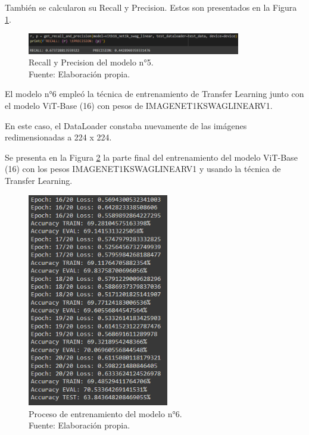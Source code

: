 También se calcularon su Recall y Precision. Estos son presentados en la Figura \ref{4:fig129}.

\begin{figure}[H]
	\begin{center}
		\includegraphics[width=0.83\textwidth]{4/figures/model5_rp.PNG}
		\caption[Recall y Precision del modelo n°5]{Recall y Precision del modelo n°5. \\
		Fuente: Elaboración propia.}
		\label{4:fig129}
	\end{center}
\end{figure}

El modelo n°6 empleó la técnica de entrenamiento de Transfer Learning junto con el modelo ViT-Base (16) con pesos de IMAGENET1KSWAGLINEARV1.

En este caso, el DataLoader constaba nuevamente de las imágenes redimensionadas a 224 x 224.

Se presenta en la Figura \ref{4:fig130} la parte final del entrenamiento del modelo ViT-Base (16) con los pesos IMAGENET1KSWAGLINEARV1 y usando la técnica de Transfer Learning.

\begin{figure}[H]
	\begin{center}
		\includegraphics[width=0.55\textwidth]{4/figures/model6_train.PNG}
		\caption[Proceso de entrenamiento del modelo n°6]{Proceso de entrenamiento del modelo n°6. \\
		Fuente: Elaboración propia.}
		\label{4:fig130}
	\end{center}
\end{figure}

